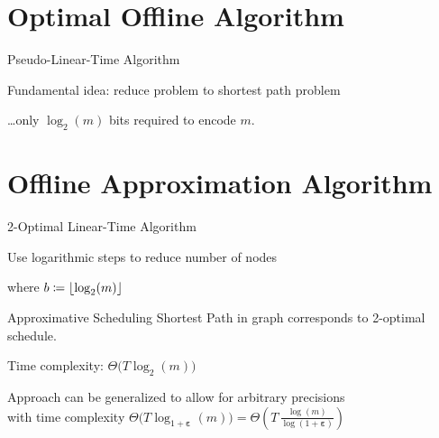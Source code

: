 \documentclass{beamer}
\DeclarePairedDelimiter\floor{\lfloor}{\rfloor}
\newcommand{\beps}{\boldsymbol\varepsilon}
\begin{document}
\section{Optimal Offline Algorithm}
\begin{frame}{Pseudo-Linear-Time Algorithm}
\centerline{Fundamental idea: reduce problem to shortest path problem}
\pause
\begin{figure}
	
\end{figure}
\pause {}

\pause\ldots only $\log_2(m)$ bits required to encode $m$.
\end{frame}
\section{Offline Approximation Algorithm}
\begin{frame}{2-Optimal Linear-Time Algorithm}
\centerline{Use logarithmic steps to reduce number of nodes}
\pause
\begin{figure}
	
\end{figure}
\centering where $b\coloneqq\floor{\log_2(m)}$
\end{frame}
\begin{frame}{Approximative Scheduling}
Shortest Path in graph corresponds to 2-optimal schedule.

\pause Time complexity: $\Theta\bigl(T\log_2(m)\bigr)$
\vspace{\baselineskip}
\pause\begin{alertbox} 
\centering Approach can be generalized to allow for arbitrary precisions\\with time complexity $\Theta\bigl(T\log_{1+\beps}(m)\bigr)=\Theta\left(T\,\frac{\log(m)}{\log(1+\beps)}\right)$
\end{alertbox}
\end{frame}
\end{document}
